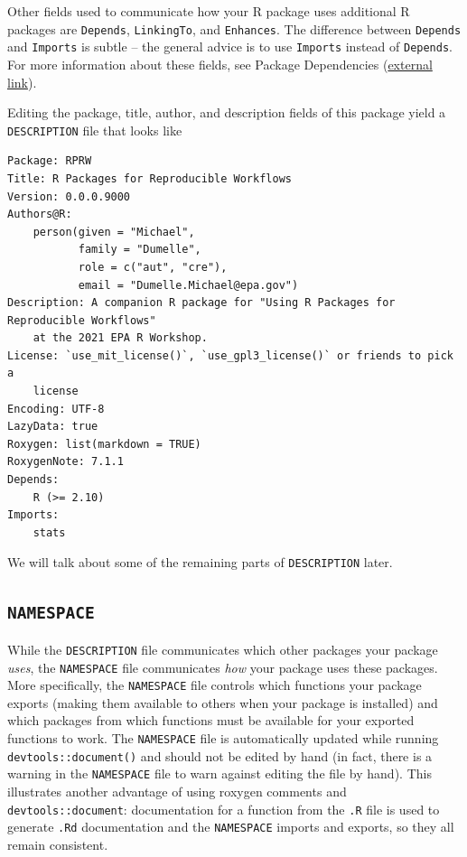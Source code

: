 \documentclass[
]{book}
\begin{document}
Other fields used to communicate how your R package uses additional R packages are \texttt{Depends}, \texttt{LinkingTo}, and \texttt{Enhances}. The difference between \texttt{Depends} and \texttt{Imports} is subtle -- the general advice is to use \texttt{Imports} instead of \texttt{Depends}. For more information about these fields, see Package Dependencies (\href{https://cran.r-project.org/doc/manuals/r-release/R-exts.html\#Package-Dependencies}{external link}).

Editing the package, title, author, and description fields of this package yield a \texttt{DESCRIPTION} file that looks like

\begin{verbatim}
Package: RPRW
Title: R Packages for Reproducible Workflows
Version: 0.0.0.9000
Authors@R: 
    person(given = "Michael",
           family = "Dumelle",
           role = c("aut", "cre"),
           email = "Dumelle.Michael@epa.gov")
Description: A companion R package for "Using R Packages for Reproducible Workflows"
    at the 2021 EPA R Workshop.
License: `use_mit_license()`, `use_gpl3_license()` or friends to pick a
    license
Encoding: UTF-8
LazyData: true
Roxygen: list(markdown = TRUE)
RoxygenNote: 7.1.1
Depends: 
    R (>= 2.10)
Imports: 
    stats
\end{verbatim}

We will talk about some of the remaining parts of \texttt{DESCRIPTION} later.

\hypertarget{namespace}{%
\subsection{\texorpdfstring{\texttt{NAMESPACE}}{NAMESPACE}}\label{namespace}}

While the \texttt{DESCRIPTION} file communicates which other packages your package \emph{uses}, the \texttt{NAMESPACE} file communicates \emph{how} your package uses these packages. More specifically, the \texttt{NAMESPACE} file controls which functions your package exports (making them available to others when your package is installed) and which packages from which functions must be available for your exported functions to work. The \texttt{NAMESPACE} file is automatically updated while running \texttt{devtools::document()} and should not be edited by hand (in fact, there is a warning in the \texttt{NAMESPACE} file to warn against editing the file by hand). This illustrates another advantage of using roxygen comments and \texttt{devtools::document}: documentation for a function from the \texttt{.R} file is used to generate \texttt{.Rd} documentation and the \texttt{NAMESPACE} imports and exports, so they all remain consistent.
\end{document}
